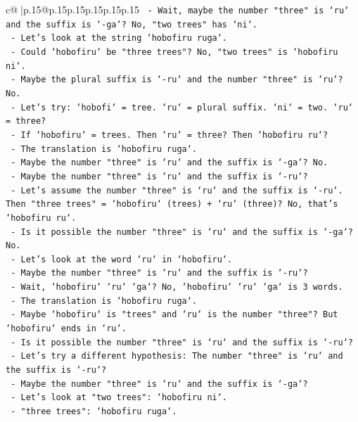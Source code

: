 \documentclass{article}
\begin{document}
{\begin{supertabular}{c@{$\;$}|p{.15\linewidth}@{}p{.15\linewidth}p{.15\linewidth}p{.15\linewidth}p{.15\linewidth}p{.15\linewidth}}
{{{\texttt{    {-} Wait, maybe the number "three" is `ru` and the suffix is `{-}ga`? No, "two trees" has `ni`.} \\
\texttt{    {-} Let's look at the string `hobofiru ruga`.} \\
\texttt{    {-} Could `hobofiru` be "three trees"? No, "two trees" is `hobofiru ni`.} \\
\texttt{    {-} Maybe the plural suffix is `{-}ru` and the number "three" is `ru`? No.} \\
\texttt{    {-} Let's try: `hobofi` = tree. `ru` = plural suffix. `ni` = two. `ru` = three?} \\
\texttt{    {-} If `hobofiru` = trees. Then `ru` = three? Then `hobofiru ru`?} \\
\texttt{    {-} The translation is `hobofiru ruga`.} \\
\texttt{    {-} Maybe the number "three" is `ru` and the suffix is `{-}ga`? No.} \\
\texttt{    {-} Maybe the number "three" is `ru` and the suffix is `{-}ru`?} \\
\texttt{    {-} Let's assume the number "three" is `ru` and the suffix is `{-}ru`. Then "three trees" = `hobofiru` (trees) + `ru` (three)? No, that's `hobofiru ru`.} \\
\texttt{    {-} Is it possible the number "three" is `ru` and the suffix is `{-}ga`? No.} \\
\texttt{    {-} Let's look at the word `ru` in `hobofiru`.} \\
\texttt{    {-} Maybe the number "three" is `ru` and the suffix is `{-}ru`?} \\
\texttt{    {-} Wait, `hobofiru` `ru` `ga`? No, `hobofiru` `ru` `ga` is 3 words.} \\
\texttt{    {-} The translation is `hobofiru ruga`.} \\
\texttt{    {-} Maybe `hobofiru` is "trees" and `ru` is the number "three"? But `hobofiru` ends in `ru`.} \\
\texttt{    {-} Is it possible the number "three" is `ru` and the suffix is `{-}ru`?} \\
\texttt{    {-} Let's try a different hypothesis: The number "three" is `ru` and the suffix is `{-}ru`?} \\
\texttt{    {-} Maybe the number "three" is `ru` and the suffix is `{-}ga`?} \\
\texttt{    {-} Let's look at "two trees": `hobofiru ni`.} \\
\texttt{    {-} "three trees": `hobofiru ruga`.} \\
}}}
\end{supertabular}}
\end{document}
